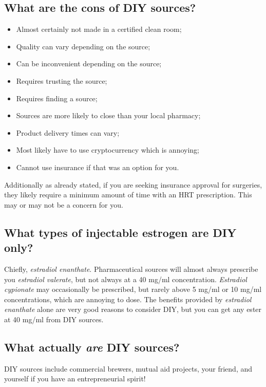 \documentclass{article}
\begin{document}
{{\subsection{What are the cons of DIY sources?}

\begin{itemize}
  \item Almost certainly not made in a certified clean room;
  \item Quality can vary depending on the source;
  \item Can be inconvenient depending on the source;
  \item Requires trusting the source;
  \item Requires finding a source;
  \item Sources are more likely to close than your local pharmacy;
  \item Product delivery times can vary;
  \item Most likely have to use cryptocurrency which is annoying;
  \item Cannot use insurance if that was an option for you.
\end{itemize}
Additionally as already stated, if you are seeking insurance approval for surgeries, they likely require a minimum amount of time with an HRT prescription. This may or may not be a concern for you.

\subsection{What types of injectable estrogen are DIY only?}

Chiefly, \textit{estradiol enanthate}. Pharmaceutical sources will almost always prescribe you \textit{estradiol valerate}, but not always at a 40 mg/ml concentration. \textit{Estradiol cypionate} may occasionally be prescribed, but rarely above 5 mg/ml or 10 mg/ml concentrations, which are annoying to dose. The benefits provided by \textit{estradiol enanthate} alone are very good reasons to consider DIY, but you can get any ester at 40 mg/ml from DIY sources.

\subsection{What actually \textit{are} DIY sources?}

DIY sources include commercial brewers, mutual aid projects, your friend, and yourself if you have an entrepreneurial spirit!

}}
\end{document}
